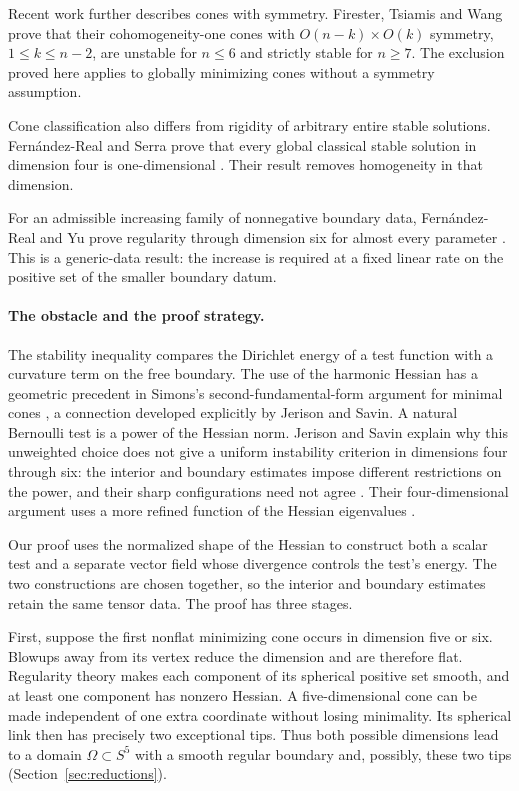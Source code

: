 Recent work further describes cones with symmetry.  Firester, Tsiamis
and Wang \cite[Theorem~1.1]{FiresterTsiamisWang2026} prove that their
cohomogeneity-one cones with $O(n-k)\times O(k)$ symmetry,
$1\leq k\leq n-2$, are unstable for $n\leq6$ and strictly stable for
$n\geq7$.  The exclusion proved here applies to globally
minimizing cones without a symmetry assumption.

Cone classification also differs from rigidity of arbitrary entire
stable solutions. Fern\'andez-Real and Serra prove that every global
classical stable solution in dimension four is one-dimensional
\cite[Theorem~1.1]{FernandezRealSerra2026}. Their result removes homogeneity in
that dimension.

For an admissible increasing family of nonnegative boundary data,
Fern\'andez-Real and Yu prove regularity through dimension six for
almost every parameter
\cite[Assumption~1 and Theorem~1.3]{FernandezRealYu2025}.
This is a generic-data result: the increase is required at a fixed linear
rate on the positive set of the smaller boundary datum.

\paragraph{The obstacle and the proof strategy.}
The stability inequality compares the Dirichlet energy of a test function
with a curvature term on the free boundary.  The use of the harmonic Hessian has a geometric precedent in Simons's
second-fundamental-form argument for minimal cones \cite[Section~6.1]{Simons1968},
a connection developed explicitly by Jerison and Savin. A natural
Bernoulli test is a power of the Hessian norm. Jerison and Savin explain why
this unweighted choice does not give a uniform instability criterion in
dimensions four through six: the interior and boundary estimates impose
different restrictions on the power, and their sharp configurations need
not agree
\cite[Section~3.2]{JerisonSavin2015}.  Their four-dimensional argument
uses a more refined function of the Hessian eigenvalues
\cite[Section~4]{JerisonSavin2015}.

Our proof uses the normalized shape of the Hessian to construct both
a scalar test and a separate vector field whose divergence controls
the test's energy.  The two constructions are chosen together, so
the interior and boundary estimates retain the same tensor data.
The proof has three stages.

First, suppose the first nonflat minimizing cone occurs in dimension
five or six.  Blowups away from its vertex reduce the dimension and
are therefore flat.  Regularity theory makes each component of its
spherical positive set smooth, and at least one component has
nonzero Hessian.  A five-dimensional cone can be made independent
of one extra coordinate without losing minimality.  Its spherical
link then has precisely two exceptional tips.  Thus both possible
dimensions lead to a domain $\Omega\subset S^5$ with a smooth
regular boundary and, possibly, these two tips
(Section~\ref{sec:reductions}).

